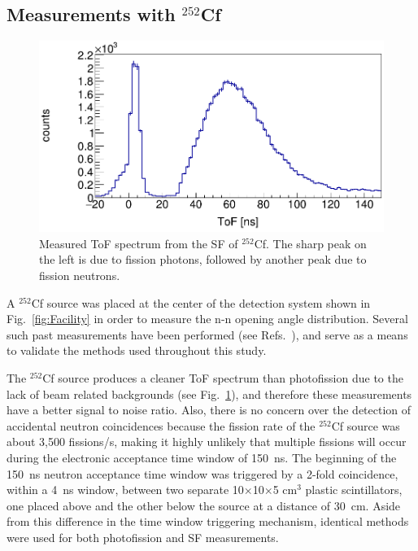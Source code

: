 \subsection{Measurements with $^{252}$Cf}
\begin{figure}[h]
\includegraphics[width=\figsize\textwidth]{Cf252ToF.png}
\caption{Measured ToF spectrum from the SF of $^{252}$Cf. The sharp peak on the left is due to fission photons, followed by another peak due to fission neutrons.}
\label{fig:Cf252ToF}
\end{figure}
A $^{252}$Cf source was placed at the center of the detection system shown in Fig.~\ref{fig:Facility} in order to measure the n-n opening angle distribution.
Several such past measurements have been performed (see Refs.~\cite{1975Cf252, Pozzi2014, 2008CF252, Verbeke2018}), and serve as a means to validate the methods used throughout this study.

The $^{252}$Cf source produces a cleaner ToF spectrum than photofission due to the lack of beam related backgrounds (see Fig.~\ref{fig:Cf252ToF}), and therefore these measurements have a better signal to noise ratio.
Also, there is no concern over the detection of accidental neutron coincidences because the fission rate of the $^{252}$Cf source was about 3,500 fissions/s, making it highly unlikely that multiple fissions will occur during the electronic acceptance time window of 150~ns.
The beginning of the 150~ns neutron acceptance time window was triggered by a 2-fold coincidence, within a 4~ns window, between two separate 10$\times$10$\times$5 cm$^3$ plastic scintillators, one placed above and the other below the source at a distance of 30~cm.
Aside from this difference in the time window triggering mechanism, identical methods were used for both photofission and SF measurements.
\FloatBarrier